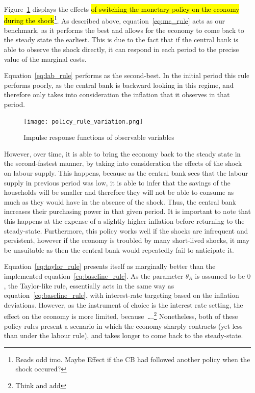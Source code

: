 \documentclass[12pt]{article}
\begin{document}
Figure~\ref{fig:policy_rule_variation} displays the effects \hl{of switching the monetary policy on the economy during the shock}\footnote{Reads odd imo. Maybe Effect if the CB had followed another policy when the shock occured?}. As described above, equation~\ref{eq:mc_rule} acts as our benchmark, as it performs the best and allows for the economy to come back to the steady state the earliest. This is due to the fact that if the central bank is able to observe the shock directly, it can respond in each period to the precise value of the marginal costs.

Equation~\ref{eq:lab_rule} performs as the second-best. In the initial period this rule performs poorly, as the central bank is backward looking in this regime, and therefore only takes into consideration the inflation that it observes in that period.  

\begin{figure}[!h]
    \caption{Impulse response functions of observable variables}\label{fig:policy_rule_variation}
    \centering
    \texttt{[image: policy\_rule\_variation.png]}
\end{figure}

However, over time, it is able to bring the economy back to the steady state in the second-fastest manner, by taking into consideration the effects of the shock on labour supply. This happens, because as the central bank sees that the labour supply in previous period was low, it is able to infer that the savings of the households will be smaller and therefore they will not be able to consume as much as they would have in the absence of the shock. Thus, the central bank increases their purchasing power in that given period. It is important to note that this happens at the expense of a slightly higher inflation before returning to the steady-state. Furthermore, this policy works well if the shocks are infrequent and persistent, however if the economy is troubled by many short-lived shocks, it may be unsuitable as then the central bank would repeatedly fail to anticipate it.

Equation~\ref{eq:taylor_rule} presents itself as marginally better than the implemented equation~\ref{eq:baseline_rule}. As the parameter $\theta_R$ is assumed to be $0$, the Taylor-like rule, essentially acts in the same way as equation~\ref{eq:baseline_rule}, with interest-rate targeting based on the inflation deviations. However, as the instrument of choice is the interest rate setting, the effect on the economy is more limited, because\ \dots.\footnote{Think and add} Nonetheless, both of these policy rules present a scenario in which the economy sharply contracts (yet less than under the labour rule), and takes longer to come back to the steady-state. 
\end{document}
